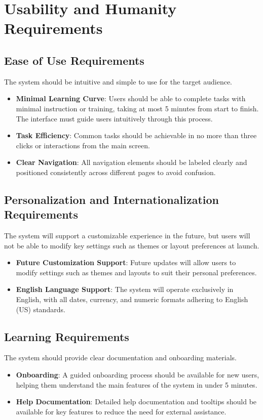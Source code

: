\documentclass[12pt]{article}
\begin{document}
\section{Usability and Humanity Requirements}

\subsection{Ease of Use Requirements}
The system should be intuitive and simple to use for the target audience.
\begin{itemize}
    \item \textbf{Minimal Learning Curve}: Users should be able to complete tasks 
    with minimal instruction or training, taking at most 5 minutes from start 
    to finish. The interface must guide users intuitively through this process.
    
    \item \textbf{Task Efficiency}: Common tasks should be achievable in no more 
    than three clicks or interactions from the main screen.
    
    \item \textbf{Clear Navigation}: All navigation elements should be labeled 
    clearly and positioned consistently across different pages to avoid confusion.
\end{itemize}

\subsection{Personalization and Internationalization Requirements}
The system will support a customizable experience in the future, but users will 
not be able to modify key settings such as themes or layout preferences at launch.
\begin{itemize}
    \item \textbf{Future Customization Support}: Future updates will allow users 
    to modify settings such as themes and layouts to suit their personal preferences.
    
    \item \textbf{English Language Support}: The system will operate exclusively 
    in English, with all dates, currency, and numeric formats adhering to 
    English (US) standards.
\end{itemize}

\subsection{Learning Requirements}
The system should provide clear documentation and onboarding materials.
\begin{itemize}
    \item \textbf{Onboarding}: A guided onboarding process should be available 
    for new users, helping them understand the main features of the system 
    in under 5 minutes.
    
    \item \textbf{Help Documentation}: Detailed help documentation and tooltips 
    should be available for key features to reduce the need for external 
    assistance.
\end{itemize}
\end{document}
